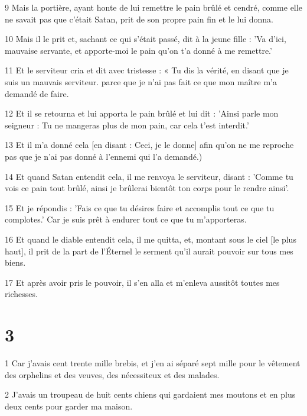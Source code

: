 \par 9 Mais la portière, ayant honte de lui remettre le pain brûlé et cendré, comme elle ne savait pas que c'était Satan, prit de son propre pain fin et le lui donna.

\par 10 Mais il le prit et, sachant ce qui s'était passé, dit à la jeune fille : 'Va d'ici, mauvaise servante, et apporte-moi le pain qu'on t'a donné à me remettre.'

\par 11 Et le serviteur cria et dit avec tristesse : « Tu dis la vérité, en disant que je suis un mauvais serviteur. parce que je n'ai pas fait ce que mon maître m'a demandé de faire.

\par 12 Et il se retourna et lui apporta le pain brûlé et lui dit : 'Ainsi parle mon seigneur : Tu ne mangeras plus de mon pain, car cela t'est interdit.'

\par 13 Et il m'a donné cela [en disant : Ceci, je le donne] afin qu'on ne me reproche pas que je n'ai pas donné à l'ennemi qui l'a demandé.)

\par 14 Et quand Satan entendit cela, il me renvoya le serviteur, disant : 'Comme tu vois ce pain tout brûlé, ainsi je brûlerai bientôt ton corps pour le rendre ainsi'.

\par 15 Et je répondis : 'Fais ce que tu désires faire et accomplis tout ce que tu complotes.' Car je suis prêt à endurer tout ce que tu m'apporteras.

\par 16 Et quand le diable entendit cela, il me quitta, et, montant sous le ciel [le plus haut], il prit de la part de l'Éternel le serment qu'il aurait pouvoir sur tous mes biens.

\par 17 Et après avoir pris le pouvoir, il s'en alla et m'enleva aussitôt toutes mes richesses.

\chapter{3}

\par 1 Car j'avais cent trente mille brebis, et j'en ai séparé sept mille pour le vêtement des orphelins et des veuves, des nécessiteux et des malades.

\par 2 J'avais un troupeau de huit cents chiens qui gardaient mes moutons et en plus deux cents pour garder ma maison.

